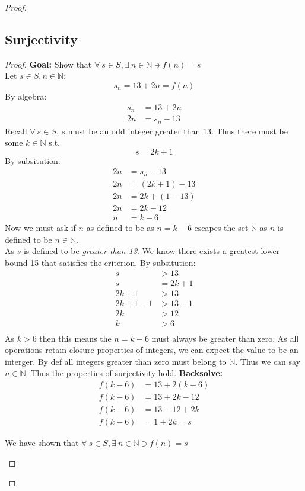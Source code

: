 \documentclass[11pt]{article}
\theoremstyle{plain}
\begin{document}
\begin{proof}
	\subsection*{Surjectivity}
	\begin{proof} \textbf{Goal:} Show that $\forall ~s \in S, \exists ~n \in \mathbb{N} \ni f(n) = s$ \\
		Let $s \in S, n \in \mathbb{N}$:
		\[
			s_n = 13 + 2n = f(n)
		\]
		By algebra:
		\begin{align*}
			s_n & = 13 + 2n  \\
			2n  & = s_n - 13
		\end{align*}
		Recall $\forall ~s \in S$, $s$ must be an odd integer greater than 13. Thus there must be some $k \in \mathbb{N}$ s.t.
		\[
			s = 2k+1
		\]
		By subsitution:
		\begin{align*}
			2n & = s_n - 13     \\
			2n & = (2k+1) - 13  \\
			2n & = 2k +(1 - 13) \\
			2n & = 2k - 12      \\
			n  & = k - 6
		\end{align*}
		Now we must ask if $n$ as defined to be as $n=k-6$ escapes the set $\mathbb{N}$ as $n$ is defined to be $n \in \mathbb{N}$. \\
		As $s$ is defined to be \textit{greater than 13}. We know there exists a greatest lower bound 15 that satisfies the criterion. By subsitution:
		\begin{align*}
			s      & > 13   \\
			s      & = 2k+1 \\
			2k+1   & > 13   \\
			2k+1-1 & > 13-1 \\
			2k     & > 12   \\
			k      & > 6    \\
		\end{align*}
		As $k > 6$ then this means the $n = k-6$ must always be greater than zero. As all operations retain closure properties of integers, we can expect the value to be an interger. By def all integers greater than zero must belong to $\mathbb{N}$. Thus we can say $n \in \mathbb{N}$. Thus the properties of surjectivity hold.
		\textbf{Backsolve:}
		\begin{align*}
			f(k-6) & = 13 + 2(k-6) \\
			f(k-6) & = 13 + 2k-12  \\
			f(k-6) & = 13-12 +2k   \\
			f(k-6) & = 1 + 2k = s
		\end{align*}
		\begin{center}
			We have shown that $\forall ~s \in S, \exists ~n \in \mathbb{N} \ni f(n) = s$
		\end{center}
	\end{proof}

\end{proof}
\end{document}
